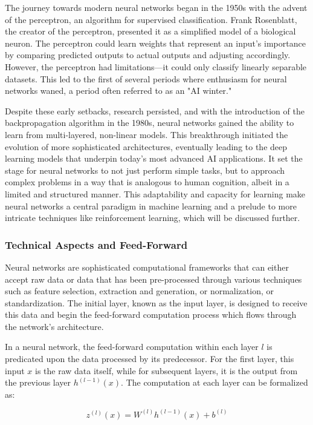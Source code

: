 The journey towards modern neural networks began in the 1950s with the advent of the perceptron, an algorithm for supervised classification. Frank Rosenblatt, the creator of the perceptron, presented it as a simplified model of a biological neuron. The perceptron could learn weights that represent an input's importance by comparing predicted outputs to actual outputs and adjusting accordingly. However, the perceptron had limitations—it could only classify linearly separable datasets. This led to the first of several periods where enthusiasm for neural networks waned, a period often referred to as an "AI winter."

Despite these early setbacks, research persisted, and with the introduction of the backpropagation algorithm in the 1980s, neural networks gained the ability to learn from multi-layered, non-linear models. This breakthrough initiated the evolution of more sophisticated architectures, eventually leading to the deep learning models that underpin today's most advanced AI applications. It set the stage for neural networks to not just perform simple tasks, but to approach complex problems in a way that is analogous to human cognition, albeit in a limited and structured manner. This adaptability and capacity for learning make neural networks a central paradigm in machine learning and a prelude to more intricate techniques like reinforcement learning, which will be discussed further.

\subsubsection{Technical Aspects and Feed-Forward}
Neural networks are sophisticated computational frameworks that can either accept raw data or data that has been pre-processed through various techniques such as feature selection, extraction and generation, or normalization, or standardization. The initial layer, known as the input layer, is designed to receive this data and begin the feed-forward computation process which flows through the network's architecture.

In a neural network, the feed-forward computation within each layer \( l \) is predicated upon the data processed by its predecessor. For the first layer, this input \( x \) is the raw data itself, while for subsequent layers, it is the output from the previous layer \( h^{(l-1)}(x) \). The computation at each layer can be formalized as:

\begin{equation}
z^{(l)}(x) = W^{(l)} h^{(l-1)}(x) + b^{(l)}
\end{equation}

